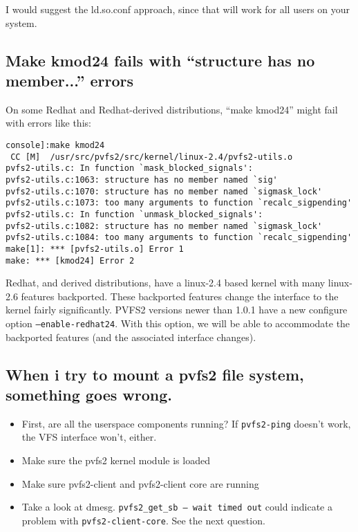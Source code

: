 \documentclass[11pt,letterpaper]{article}
\begin{document}
I would suggest the ld.so.conf approach, since that will work for all users on
your system.

\subsection{Make kmod24 fails with ``structure has no member...'' errors}

On some Redhat and Redhat-derived distributions, ``make kmod24'' might
fail with errors like this:

\begin{verbatim}
console]:make kmod24
 CC [M]  /usr/src/pvfs2/src/kernel/linux-2.4/pvfs2-utils.o
pvfs2-utils.c: In function `mask_blocked_signals':
pvfs2-utils.c:1063: structure has no member named `sig'
pvfs2-utils.c:1070: structure has no member named `sigmask_lock'
pvfs2-utils.c:1073: too many arguments to function `recalc_sigpending'
pvfs2-utils.c: In function `unmask_blocked_signals':
pvfs2-utils.c:1082: structure has no member named `sigmask_lock'
pvfs2-utils.c:1084: too many arguments to function `recalc_sigpending'
make[1]: *** [pvfs2-utils.o] Error 1
make: *** [kmod24] Error 2
\end{verbatim}

Redhat, and derived distributions, have a linux-2.4 based kernel with many
linux-2.6 features backported.  These backported features change the
interface to the kernel fairly significantly.  PVFS2 versions newer than
1.0.1 have a new configure option \texttt{--enable-redhat24}.  With this
option, we will be able to accommodate the backported features (and the
associated interface changes).

\subsection{When i try to mount a pvfs2 file system, something goes wrong.}

\begin{itemize}
\item First, are all the userspace components running?  If \texttt{pvfs2-ping}
doesn't work, the VFS interface won't, either.
\item Make sure the pvfs2 kernel module is loaded
\item Make sure pvfs2-client and pvfs2-client core are running
\item Take a look at dmesg.  \texttt{pvfs2\_get\_sb -- wait timed out} could
      indicate a problem with \texttt{pvfs2-client-core}.  See the next
      question.
\end{itemize}
\end{document}
